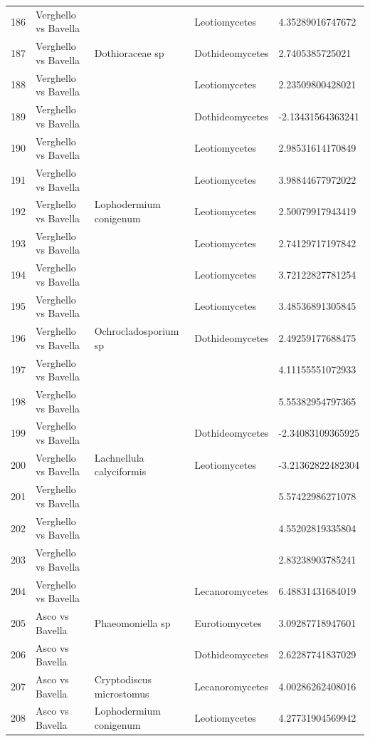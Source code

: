 \documentclass[12pt]{article}\usepackage[]{graphicx}\usepackage[]{color}
\numberwithin{figure}{section}
\begin{document}
\begin{table}[ht]
\begin{tabular}{lllll}
  186 & Verghello vs Bavella &  & Leotiomycetes & 4.35289016747672 \\ 
  187 & Verghello vs Bavella & Dothioraceae sp & Dothideomycetes & 2.7405385725021 \\ 
  188 & Verghello vs Bavella &  & Leotiomycetes & 2.23509800428021 \\ 
  189 & Verghello vs Bavella &  & Dothideomycetes & -2.13431564363241 \\ 
  190 & Verghello vs Bavella &  & Leotiomycetes & 2.98531614170849 \\ 
  191 & Verghello vs Bavella &  & Leotiomycetes & 3.98844677972022 \\ 
  192 & Verghello vs Bavella & Lophodermium conigenum & Leotiomycetes & 2.50079917943419 \\ 
  193 & Verghello vs Bavella &  & Leotiomycetes & 2.74129717197842 \\ 
  194 & Verghello vs Bavella &  & Leotiomycetes & 3.72122827781254 \\ 
  195 & Verghello vs Bavella &  & Leotiomycetes & 3.48536891305845 \\ 
  196 & Verghello vs Bavella & Ochrocladosporium sp & Dothideomycetes & 2.49259177688475 \\ 
  197 & Verghello vs Bavella &  &  & 4.11155551072933 \\ 
  198 & Verghello vs Bavella &  &  & 5.55382954797365 \\ 
  199 & Verghello vs Bavella &  & Dothideomycetes & -2.34083109365925 \\ 
  200 & Verghello vs Bavella & Lachnellula calyciformis & Leotiomycetes & -3.21362822482304 \\ 
  201 & Verghello vs Bavella &  &  & 5.57422986271078 \\ 
  202 & Verghello vs Bavella &  &  & 4.55202819335804 \\ 
  203 & Verghello vs Bavella &  &  & 2.83238903785241 \\ 
  204 & Verghello vs Bavella &  & Lecanoromycetes & 6.48831431684019 \\ 
  205 & Asco vs Bavella & Phaeomoniella sp & Eurotiomycetes & 3.09287718947601 \\ 
  206 & Asco vs Bavella &  & Dothideomycetes & 2.62287741837029 \\ 
  207 & Asco vs Bavella & Cryptodiscus microstomus & Lecanoromycetes & 4.00286262408016 \\ 
  208 & Asco vs Bavella & Lophodermium conigenum & Leotiomycetes & 4.27731904569942 \\ 

\end{tabular}
\end{table}
\end{document}
